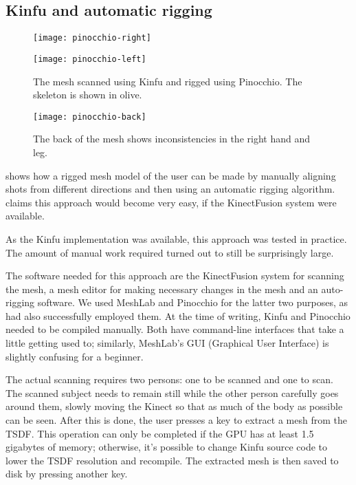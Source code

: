 \subsection{Kinfu and automatic rigging} \label{kinfurig}

\begin{figure}
    \centering
    \begin{minipage}{0.49\textwidth}
        \texttt{[image: pinocchio-right]}
    \end{minipage}
    \begin{minipage}{0.49\textwidth}
        \texttt{[image: pinocchio-left]}
    \end{minipage}
    \caption{The mesh scanned using Kinfu and rigged using Pinocchio. The skeleton is shown in olive.}
    \label{fig:hannu-front}
\end{figure}

\begin{figure}
    \centering
    \texttt{[image: pinocchio-back]}
    \caption{The back of the mesh shows inconsistencies in the right hand and leg.}
    \label{fig:hannu-back}
\end{figure}

\citet{charpentier2011accurate} shows how a rigged mesh model of the user can be made by manually aligning shots from different directions and then using an automatic rigging algorithm. \citeauthor{charpentier2011accurate} claims this approach would become very easy, if the KinectFusion system were available.

As the Kinfu implementation was available, this approach was tested in practice. The amount of manual work required turned out to still be surprisingly large.

The software needed for this approach are the KinectFusion system for scanning the mesh, a mesh editor for making necessary changes in the mesh and an auto-rigging software. We used MeshLab and Pinocchio for the latter two purposes, as \citet{charpentier2011accurate} had also successfully employed them. At the time of writing, Kinfu and Pinocchio needed to be compiled manually. Both have command-line interfaces that take a little getting used to; similarly, MeshLab's GUI (Graphical User Interface) is slightly confusing for a beginner.

The actual scanning requires two persons: one to be scanned and one to scan. The scanned subject needs to remain still while the other person carefully goes around them, slowly moving the Kinect so that as much of the body as possible can be seen. After this is done, the user presses a key to extract a mesh from the TSDF. This operation can only be completed if the GPU has at least 1.5 gigabytes of memory; otherwise, it's possible to change Kinfu source code to lower the TSDF resolution and recompile. The extracted mesh is then saved to disk by pressing another key.

